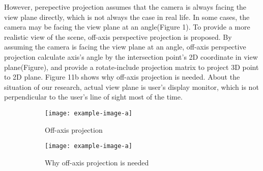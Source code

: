 However, perepective projection assumes that the camera is always facing the view plane directly, which is not always the case in real life. In some cases, the camera may be facing the view plane at an angle(Figure 1). To provide a more realistic view of the scene, off-axis perspective projection is proposed\cite{off-axis}\cite{Kooima2011GeneralizedPP}. By assuming the camera is facing the view plane at an angle, off-axis perspective projection calculate axis's angle by the intersection point's 2D coordinate in view plane(Figure), and provide a rotate-include projection matrix to project 3D point to 2D plane.
Figure 11b shows why off-axis projection is needed. About the situation of our research, actual view plane is user's display monitor, which is not perpendicular to the user's line of sight most of the time.
\begin{figure}[htb]
    \centering
    \begin{subfigure}[t]{.45\linewidth}
        \centering
        \texttt{[image: example-image-a]}
        \caption{Off-axis projection}\label{F:test-b-sub-a}
    \end{subfigure}
    \begin{subfigure}[t]{.45\linewidth}
        \centering
        \texttt{[image: example-image-a]}
        \caption{Why off-axis projection is needed}\label{F:test-b-sub-b}
    \end{subfigure}
    \caption{}\label{F:test-b}
\end{figure}